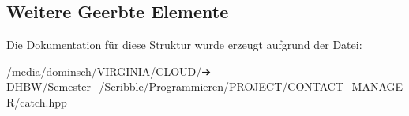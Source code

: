 \subsection*{Weitere Geerbte Elemente}


Die Dokumentation für diese Struktur wurde erzeugt aufgrund der Datei\+:\begin{DoxyCompactItemize}
\item 
/media/dominsch/\+V\+I\+R\+G\+I\+N\+I\+A/\+C\+L\+O\+U\+D/➔ D\+H\+B\+W/\+Semester\+\_/\+Scribble/\+Programmieren/\+P\+R\+O\+J\+E\+C\+T/\+C\+O\+N\+T\+A\+C\+T\+\_\+\+M\+A\+N\+A\+G\+E\+R/catch.\+hpp\end{DoxyCompactItemize}
